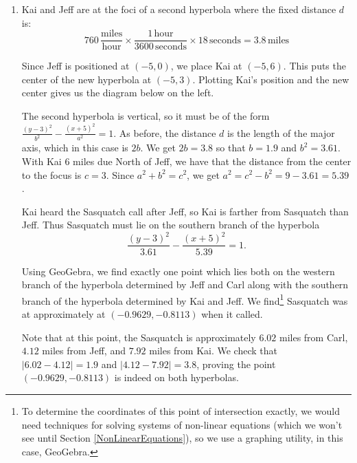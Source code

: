 \documentclass{ximera}
\begin{document}
\begin{example}
\begin{explanation}
\begin{enumerate}
We are seeking a curve of the form $\frac{x^2}{a^2} - \frac{y^2}{b^2} = 1$ in which the distance from the center to each focus is $c = 5$.  As we saw in the derivation of the standard equation of the hyperbola, Equation \ref{standardhhyperbola}, $d = 2a$, so that $2a = 1.9$, or $a = 0.95$ and $a^2 = 0.9025$.  All that remains is to find $b^2$.  To that end, we recall that $a^2 + b^2 = c^2$ so $b^2 = c^2 - a^2 = 25 - 0.9025 = 24.0975$. Since Sasquatch is closer to Jeff than it is to Carl, it must be on the western (left hand) branch of \[ \frac{x^2}{0.9025} - \frac{y^2}{24.0975} = 1.\]  

\item  Kai and Jeff are at the foci of a second hyperbola where the fixed distance $d$ is:  \[760 \, \frac{\mbox{miles}}{\mbox{hour}} \times \frac{ 1 \, \mbox{hour}}{ 3600 \, \mbox{seconds}} \times 18 \, \mbox{seconds}  = 3.8 \, \mbox{miles}\]  

Since Jeff is positioned at $(-5, 0)$, we place Kai at $(-5, 6)$.  This puts the center of the new hyperbola at $(-5, 3)$.  Plotting Kai's position and the new center gives us the diagram below on the left. 




The second hyperbola is vertical, so it must be of the form $\frac{(y-3)^2}{b^2} - \frac{(x+5)^2}{a^2} = 1$.  As before, the distance $d$ is the length of the major axis, which in this case is $2b$.  We get $2b = 3.8$ so that $b = 1.9$ and $b^2 = 3.61$.  With Kai $6$ miles due North of Jeff, we have that the distance from the center to the focus is $c = 3$.  Since $a^2 + b^2 = c^2$, we get $a^2 = c^2 - b^2 = 9 - 3.61 = 5.39$.  




Kai heard the Sasquatch call after Jeff, so Kai is farther from Sasquatch than Jeff.  Thus Sasquatch must lie on the southern branch of the hyperbola \[ \frac{(y-3)^2}{3.61} - \frac{(x+5)^2}{5.39} = 1.\] 

Using GeoGebra, we find exactly one point which lies both on the western branch of the hyperbola determined by Jeff and Carl along with the southern branch of the hyperbola determined by Kai and Jeff.  We find\footnote{To determine the coordinates of this point of intersection exactly, we would need techniques for solving systems of non-linear equations (which we won't see until Section \ref{NonLinearEquations}), so we use a graphing utility, in this case, GeoGebra.} Sasquatch was at approximately at $(-0.9629, -0.8113)$ when it called.

\begin{center}
\end{center}

Note that at this point, the Sasquatch is approximately $6.02$ miles from Carl, $4.12$ miles from Jeff, and $7.92$ miles from Kai.  We check that $|6.02 - 4.12| = 1.9$ and $|4.12 - 7.92| = 3.8$, proving the point $(-0.9629, -0.8113)$ is indeed on both hyperbolas.    

\end{enumerate}
\end{explanation}
\end{example}
\end{document}
